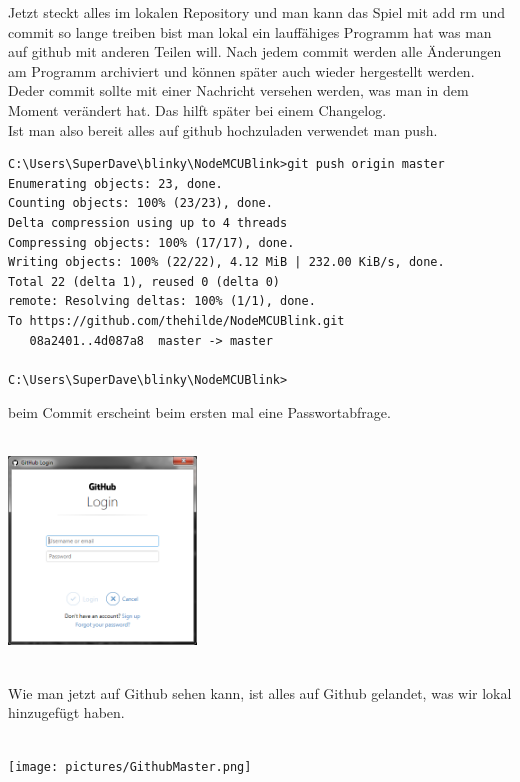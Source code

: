 Jetzt steckt alles im lokalen Repository und man kann das Spiel mit add rm und commit so lange treiben bist man lokal ein lauffähiges Programm hat was man auf github mit anderen Teilen will. Nach jedem commit  werden alle Änderungen am Programm archiviert und können später auch wieder hergestellt werden. Deder commit sollte mit einer Nachricht versehen werden, was man in dem Moment verändert hat. Das hilft später bei einem Changelog.\\
Ist man also bereit alles auf github hochzuladen verwendet man push.\\
\begin{verbatim}
C:\Users\SuperDave\blinky\NodeMCUBlink>git push origin master
Enumerating objects: 23, done.
Counting objects: 100% (23/23), done.
Delta compression using up to 4 threads
Compressing objects: 100% (17/17), done.
Writing objects: 100% (22/22), 4.12 MiB | 232.00 KiB/s, done.
Total 22 (delta 1), reused 0 (delta 0)
remote: Resolving deltas: 100% (1/1), done.
To https://github.com/thehilde/NodeMCUBlink.git
   08a2401..4d087a8  master -> master

C:\Users\SuperDave\blinky\NodeMCUBlink>
\end{verbatim}
beim Commit erscheint beim ersten mal eine Passwortabfrage.\\
\ \\
\begin{minipage}[t]{\textwidth}
  \centering
  \includegraphics[height=5cm]{pictures/GithubPush.png}
  \label{img:GithubPush}
  \end{minipage}
\ \\
Wie man jetzt auf Github sehen kann, ist alles auf Github gelandet, was wir lokal hinzugefügt haben.\\
\ \\
\begin{minipage}[t]{\textwidth}
  \centering
  \texttt{[image: pictures/GithubMaster.png]}
  \label{img:GithubMaster}
  \end{minipage}  
